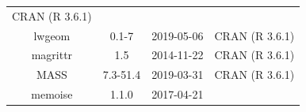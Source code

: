 \documentclass[11pt,]{book}
\begin{document}
\begin{longtable}[]{@{}cccc@{}}
\begin{minipage}[t]{0.36\columnwidth}
CRAN (R 3.6.1)\strut
\end{minipage}\tabularnewline
\begin{minipage}[t]{0.18\columnwidth}\centering\strut
lwgeom\strut
\end{minipage} & \begin{minipage}[t]{0.19\columnwidth}\centering\strut
0.1-7\strut
\end{minipage} & \begin{minipage}[t]{0.16\columnwidth}\centering\strut
2019-05-06\strut
\end{minipage} & \begin{minipage}[t]{0.36\columnwidth}\centering\strut
CRAN (R 3.6.1)\strut
\end{minipage}\tabularnewline
\begin{minipage}[t]{0.18\columnwidth}\centering\strut
magrittr\strut
\end{minipage} & \begin{minipage}[t]{0.19\columnwidth}\centering\strut
1.5\strut
\end{minipage} & \begin{minipage}[t]{0.16\columnwidth}\centering\strut
2014-11-22\strut
\end{minipage} & \begin{minipage}[t]{0.36\columnwidth}\centering\strut
CRAN (R 3.6.1)\strut
\end{minipage}\tabularnewline
\begin{minipage}[t]{0.18\columnwidth}\centering\strut
MASS\strut
\end{minipage} & \begin{minipage}[t]{0.19\columnwidth}\centering\strut
7.3-51.4\strut
\end{minipage} & \begin{minipage}[t]{0.16\columnwidth}\centering\strut
2019-03-31\strut
\end{minipage} & \begin{minipage}[t]{0.36\columnwidth}\centering\strut
CRAN (R 3.6.1)\strut
\end{minipage}\tabularnewline
\begin{minipage}[t]{0.18\columnwidth}\centering\strut
memoise\strut
\end{minipage} & \begin{minipage}[t]{0.19\columnwidth}\centering\strut
1.1.0\strut
\end{minipage} & \begin{minipage}[t]{0.16\columnwidth}\centering\strut
2017-04-21\strut
\end{minipage} & \begin{minipage}[t]{0.36\columnwidth}\centering\strut

\end{minipage}
\end{longtable}
\end{document}
